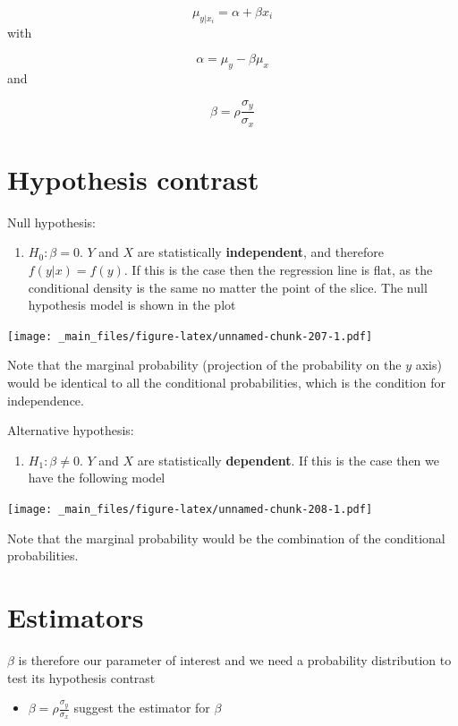 \documentclass[
]{book}
\providecommand{\tightlist}{%
  \setlength{\itemsep}{0pt}\setlength{\parskip}{0pt}}
\begin{document}
\[\mu_{y|x_i}=\alpha + \beta x_i\]
with

\[\alpha=\mu_y-\beta\mu_x\]
and

\[\beta=\rho\frac{\sigma_y}{\sigma_x}\]

\hypertarget{hypothesis-contrast-1}{%
\section{Hypothesis contrast}\label{hypothesis-contrast-1}}

Null hypothesis:

\begin{enumerate}
\def\labelenumi{\alph{enumi}.}
\tightlist
\item
  \(H_0: \beta=0\). \(Y\) and \(X\) are statistically \textbf{independent}, and therefore \(f(y|x)=f(y)\). If this is the case then the regression line is flat, as the conditional density is the same no matter the point of the slice. The null hypothesis model is shown in the plot
\end{enumerate}

\texttt{[image: \_main\_files/figure-latex/unnamed-chunk-207-1.pdf]}

Note that the marginal probability (projection of the probability on the \(y\) axis) would be identical to all the conditional probabilities, which is the condition for independence.

Alternative hypothesis:

\begin{enumerate}
\def\labelenumi{\alph{enumi}.}
\setcounter{enumi}{1}
\tightlist
\item
  \(H_1: \beta\neq 0\). \(Y\) and \(X\) are statistically \textbf{dependent}. If this is the case then we have the following model
\end{enumerate}

\texttt{[image: \_main\_files/figure-latex/unnamed-chunk-208-1.pdf]}

Note that the marginal probability would be the combination of the conditional probabilities.

\hypertarget{estimators-1}{%
\section{Estimators}\label{estimators-1}}

\(\beta\) is therefore our parameter of interest and we need a probability distribution to test its hypothesis contrast

\begin{itemize}
\tightlist
\item
  \(\beta=\rho\frac{\sigma_y}{\sigma_x}\) suggest the estimator for \(\beta\)
\end{itemize}
\end{document}
